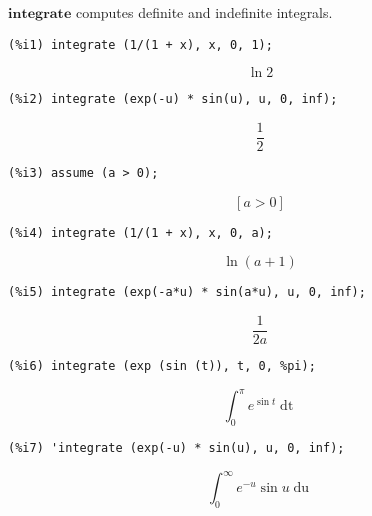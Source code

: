 \documentclass[12pt,leqno]{article}
\begin{document}
$\mathbf{integrate}$ computes definite and indefinite integrals.
\begin{verbatim}
(%i1) integrate (1/(1 + x), x, 0, 1);
\end{verbatim}
\begin{dmath}[number={\(\mathop{\mathrm{\%o}_{1}}\)}]
\ln 2
\end{dmath}
\begin{verbatim}
(%i2) integrate (exp(-u) * sin(u), u, 0, inf);
\end{verbatim}
\begin{dmath}[number={\(\mathop{\mathrm{\%o}_{2}}\)}]
\frac{1}{2}
\end{dmath}
\begin{verbatim}
(%i3) assume (a > 0);
\end{verbatim}
\begin{dmath}[number={\(\mathop{\mathrm{\%o}_{3}}\)}]
\left[a > 0\right]
\end{dmath}
\begin{verbatim}
(%i4) integrate (1/(1 + x), x, 0, a);
\end{verbatim}
\begin{dmath}[number={\(\mathop{\mathrm{\%o}_{4}}\)}]
\ln \left(a+1\right)
\end{dmath}
\begin{verbatim}
(%i5) integrate (exp(-a*u) * sin(a*u), u, 0, inf);
\end{verbatim}
\begin{dmath}[number={\(\mathop{\mathrm{\%o}_{5}}\)}]
\frac{1}{2 a}
\end{dmath}
\begin{verbatim}
(%i6) integrate (exp (sin (t)), t, 0, %pi);
\end{verbatim}
\begin{dmath}[number={\(\mathop{\mathrm{\%o}_{6}}\)}]
\int_{0}^{\pi} {e}^{\sin t}\mathop{\mathrm{d}t}
\end{dmath}
\begin{verbatim}
(%i7) 'integrate (exp(-u) * sin(u), u, 0, inf);
\end{verbatim}
\begin{dmath}[number={\(\mathop{\mathrm{\%o}_{7}}\)}]
\int_{0}^{\infty} {e}^{-u} \sin u\mathop{\mathrm{d}u}
\end{dmath}
\end{document}

